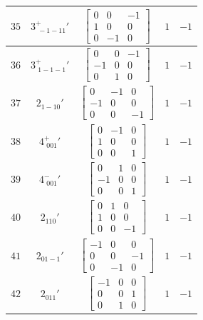 \documentclass[fleqn,8pt]{jsarticle}
\begin{document}
\begin{longtable}{ccccc}
$ 35 $ & $ 3^{+}_{\,\,-1-11}{}' $ & $ \begin{bmatrix} 0 & 0 & -1 \\ 1 & 0 & 0 \\ 0 & -1 & 0 \end{bmatrix} $ & $ 1 $ & $ -1 $ \\ \hline
$ 36 $ & $ 3^{+}_{\,\,1-1-1}{}' $ & $ \begin{bmatrix} 0 & 0 & -1 \\ -1 & 0 & 0 \\ 0 & 1 & 0 \end{bmatrix} $ & $ 1 $ & $ -1 $ \\ \hline
$ 37 $ & $ 2{}_{1-10}{}' $ & $ \begin{bmatrix} 0 & -1 & 0 \\ -1 & 0 & 0 \\ 0 & 0 & -1 \end{bmatrix} $ & $ 1 $ & $ -1 $ \\ \hline
$ 38 $ & $ 4^{+}_{\,\,001}{}' $ & $ \begin{bmatrix} 0 & -1 & 0 \\ 1 & 0 & 0 \\ 0 & 0 & 1 \end{bmatrix} $ & $ 1 $ & $ -1 $ \\ \hline
$ 39 $ & $ 4^{-}_{\,\,001}{}' $ & $ \begin{bmatrix} 0 & 1 & 0 \\ -1 & 0 & 0 \\ 0 & 0 & 1 \end{bmatrix} $ & $ 1 $ & $ -1 $ \\ \hline
$ 40 $ & $ 2{}_{110}{}' $ & $ \begin{bmatrix} 0 & 1 & 0 \\ 1 & 0 & 0 \\ 0 & 0 & -1 \end{bmatrix} $ & $ 1 $ & $ -1 $ \\ \hline
$ 41 $ & $ 2{}_{01-1}{}' $ & $ \begin{bmatrix} -1 & 0 & 0 \\ 0 & 0 & -1 \\ 0 & -1 & 0 \end{bmatrix} $ & $ 1 $ & $ -1 $ \\ \hline
$ 42 $ & $ 2{}_{011}{}' $ & $ \begin{bmatrix} -1 & 0 & 0 \\ 0 & 0 & 1 \\ 0 & 1 & 0 \end{bmatrix} $ & $ 1 $ & $ -1 $ \\ \hline

\end{longtable}
\end{document}
